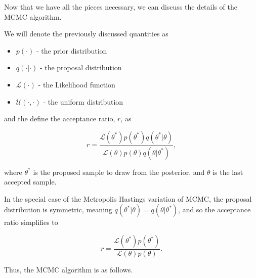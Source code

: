     Now that we have all the pieces necessary, we can discuss the details of the MCMC algorithm.

    We will denote the previously discussed quantities as

    \begin{itemize}
        \item $p(\cdot)$ - the prior distribution
        \item $q(\cdot|\cdot)$ - the proposal distribution
        \item $\mathcal{L}(\cdot)$ - the Likelihood function
        \item $\mathcal{U}(\cdot,\cdot)$ - the uniform distribution
    \end{itemize}

    and the define the acceptance ratio, $r$, as

    $$
        r = \frac{\mathcal{L}(\theta^*)p(\theta^*)q(\theta^*|\theta)}{\mathcal{L}(\theta)p(\theta)q(\theta|\theta^*)},
    $$

    where $\theta^*$ is the proposed sample to draw from the posterior, and $\theta$ is the last accepted sample.

    In the special case of the Metropolis Hastings variation of MCMC, the proposal distribution is symmetric, meaning $q(\theta^*|\theta) = q(\theta|\theta^*)$, and so the acceptance ratio simplifies to

    $$
        r = \frac{\mathcal{L}(\theta^*)p(\theta^*)}{\mathcal{L}(\theta)p(\theta)}.
    $$

    Thus, the MCMC algorithm is as follows.
    
